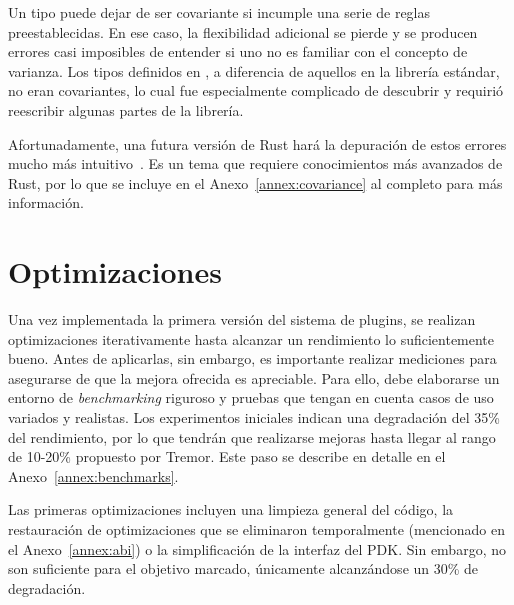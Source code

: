 Un tipo puede dejar de ser covariante si incumple una serie de reglas
preestablecidas. En ese caso, la flexibilidad adicional se pierde y se producen
errores casi imposibles de entender si uno no es familiar con el concepto de
varianza. Los tipos definidos en \abistable, a diferencia de aquellos en la
librería estándar, no eran covariantes, lo cual fue especialmente complicado de
descubrir y requirió reescribir algunas partes de la librería.

Afortunadamente, una futura versión de Rust hará la depuración de estos errores
mucho más intuitivo~\cite{smarterchecker}. Es un tema que requiere conocimientos
más avanzados de Rust, por lo que se incluye en el Anexo~\ref{annex:covariance}
al completo para más información.

\section{Optimizaciones}

Una vez implementada la primera versión del sistema de plugins, se realizan
optimizaciones iterativamente hasta alcanzar un rendimiento lo suficientemente
bueno. Antes de aplicarlas, sin embargo, es importante realizar mediciones para
asegurarse de que la mejora ofrecida es apreciable. Para ello, debe elaborarse
un entorno de \emph{benchmarking} riguroso y pruebas que tengan en cuenta casos
de uso variados y realistas. Los experimentos iniciales indican una degradación
del 35\% del rendimiento, por lo que tendrán que realizarse mejoras hasta llegar
al rango de 10-20\% propuesto por Tremor. Este paso se describe en detalle en el
Anexo~\ref{annex:benchmarks}.

Las primeras optimizaciones incluyen una limpieza general del código, la
restauración de optimizaciones que se eliminaron temporalmente (mencionado en el
Anexo~\ref{annex:abi}) o la simplificación de la interfaz del PDK. Sin embargo,
no son suficiente para el objetivo marcado, únicamente alcanzándose un 30\% de
degradación.
